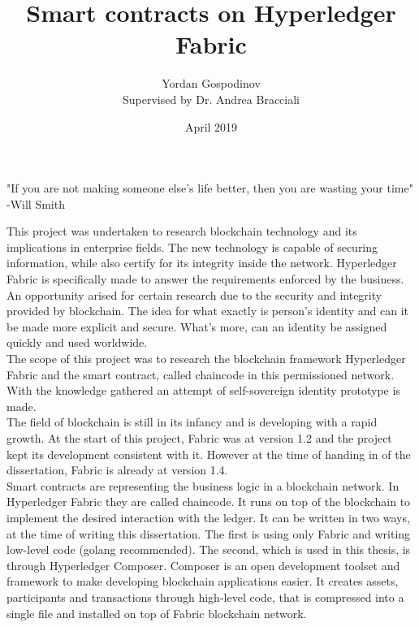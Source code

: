 \documentclass[a4paper,11pt]{report}
\title{Smart contracts on Hyperledger Fabric}
\author{
{Yordan Gospodinov} \\
{\small{Supervised by Dr. Andrea Bracciali}}
}
\date{April 2019}
\begin{document}
\maketitle				




\begin{center}
\Huge "If you are not making someone else's life better, then you are wasting your time" -Will Smith
\end{center}

\clearpage    



  This project was undertaken to research blockchain technology and its implications in enterprise fields. The new technology is capable of securing information, while also certify for its integrity inside the network. Hyperledger Fabric is specifically made to answer the requirements enforced by the business.  
\\  

  An opportunity arised for certain research due to the security and integrity provided by blockchain. The idea for what exactly is person’s identity and can it be made more explicit and secure. What's more, can an identity be assigned quickly and used worldwide.
\\

	The scope of this project was to research the blockchain framework Hyperledger Fabric and the smart contract, called chaincode in this permissioned network. With the knowledge gathered an attempt of self-sovereign identity prototype is made.
\\
 
	The field of blockchain is still in its infancy and is developing with a rapid growth. At the start of this project, Fabric was at version 1.2 and the project kept its development consistent with it. However at the time of handing in of the dissertation, Fabric is already at version 1.4. 
\\

	Smart contracts are  representing the business logic in a blockchain network. In Hyperledger Fabric they are called chaincode. It runs on top of the blockchain to implement the desired interaction with the ledger. It can be written in two ways, at the time of writing this dissertation. The first is using only Fabric and writing low-level code (golang recommended). The second, which is used in this thesis, is through Hyperledger Composer. Composer is an open development toolset and framework to make developing blockchain applications easier. It creates assets, participants and transactions through high-level code, that is compressed into a single file and installed on top of Fabric blockchain network. 
\end{document}

